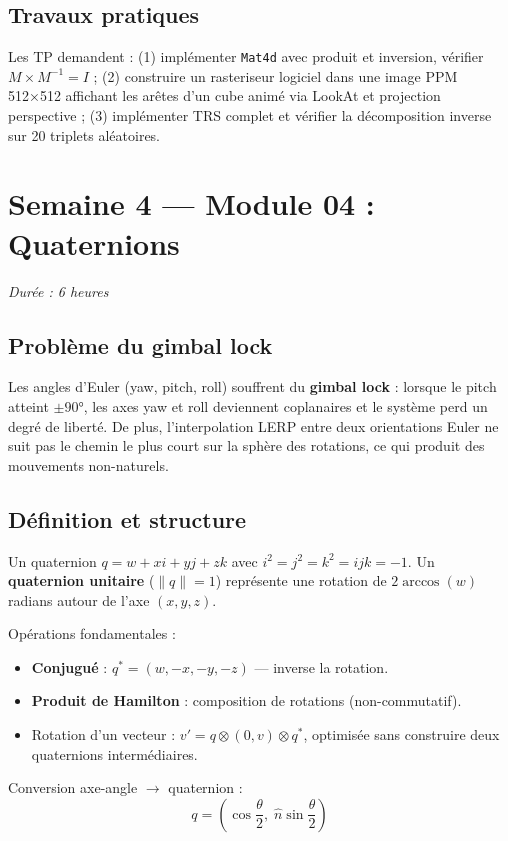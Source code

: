 \documentclass[11pt,a4paper]{article}
\begin{document}
\subsection{Travaux pratiques}
Les TP demandent : (1) implémenter \texttt{Mat4d} avec produit et inversion, vérifier
$M \times M^{-1} = I$ ; (2) construire un rasteriseur logiciel dans une image PPM 512×512
affichant les arêtes d'un cube animé via LookAt et projection perspective ; (3) implémenter TRS
complet et vérifier la décomposition inverse sur 20 triplets aléatoires.

\section{Semaine 4 — Module 04 : Quaternions}
\textit{Durée : 6 heures}

\subsection{Problème du gimbal lock}
Les angles d'Euler (yaw, pitch, roll) souffrent du \textbf{gimbal lock} : lorsque le pitch
atteint $\pm 90°$, les axes yaw et roll deviennent coplanaires et le système perd un degré de
liberté. De plus, l'interpolation LERP entre deux orientations Euler ne suit pas le chemin le plus
court sur la sphère des rotations, ce qui produit des mouvements non-naturels.

\subsection{Définition et structure}
Un quaternion $q = w + xi + yj + zk$ avec $i^2 = j^2 = k^2 = ijk = -1$.
Un \textbf{quaternion unitaire} ($\|q\| = 1$) représente une rotation de $2\arccos(w)$ radians
autour de l'axe $(x, y, z)$.

Opérations fondamentales :
\begin{itemize}[noitemsep]
  \item \textbf{Conjugué} : $q^* = (w, -x, -y, -z)$ — inverse la rotation.
  \item \textbf{Produit de Hamilton} : composition de rotations (non-commutatif).
  \item Rotation d'un vecteur : $v' = q \otimes (0, v) \otimes q^*$, optimisée sans construire deux
        quaternions intermédiaires.
\end{itemize}

Conversion axe-angle $\to$ quaternion :
\[
  q = \left(\cos\frac{\theta}{2},\; \hat{n}\sin\frac{\theta}{2}\right)
\]
\end{document}
